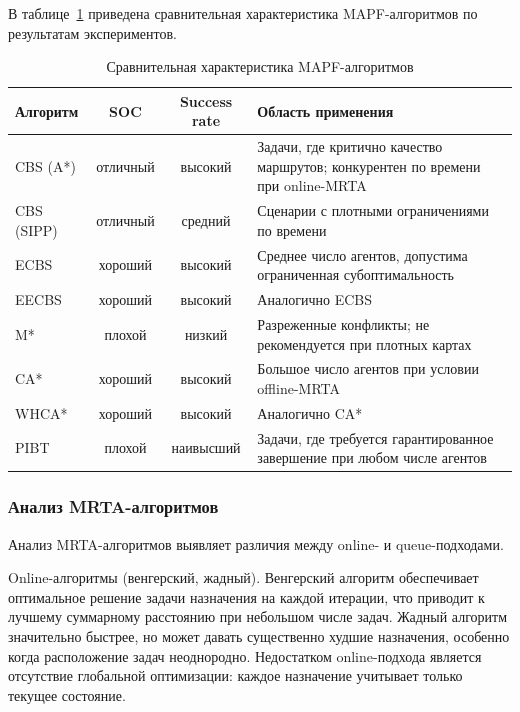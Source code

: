 В таблице~\ref{tab:mapf_comparison} приведена сравнительная характеристика MAPF-алгоритмов по результатам экспериментов.

\begin{table}
    \caption{Сравнительная характеристика MAPF-алгоритмов}
    \begin{tabularx}{\textwidth}{|l|c|c|X|}\hline
    Алгоритм & SOC & Success rate & Область применения \\ \hline
    CBS (A*)   & отличный & высокий      & Задачи, где критично качество маршрутов; конкурентен по времени при online-MRTA \\ \hline
    CBS (SIPP) & отличный & средний      & Сценарии с плотными ограничениями по времени \\ \hline
    ECBS       & хороший  & высокий      & Среднее число агентов, допустима ограниченная субоптимальность \\ \hline
    EECBS      & хороший  & высокий      & Аналогично ECBS \\ \hline
    M*         & плохой   & низкий       & Разреженные конфликты; не рекомендуется при плотных картах \\ \hline
    CA*        & хороший  & высокий      & Большое число агентов при условии offline-MRTA \\ \hline
    WHCA*      & хороший  & высокий      & Аналогично CA* \\ \hline
    PIBT       & плохой   & наивысший    & Задачи, где требуется гарантированное завершение при любом числе агентов \\ \hline
    \end{tabularx}
    \label{tab:mapf_comparison}
\end{table}


\subsubsection{Анализ MRTA-алгоритмов}

Анализ MRTA-алгоритмов выявляет различия между online- и queue-подходами.

Online-алгоритмы (венгерский, жадный). Венгерский алгоритм обеспечивает оптимальное решение задачи назначения на каждой итерации, что приводит к лучшему суммарному расстоянию при небольшом числе задач. Жадный алгоритм значительно быстрее, но может давать существенно худшие назначения, особенно когда расположение задач неоднородно. Недостатком online-подхода является отсутствие глобальной оптимизации: каждое назначение учитывает только текущее состояние.

